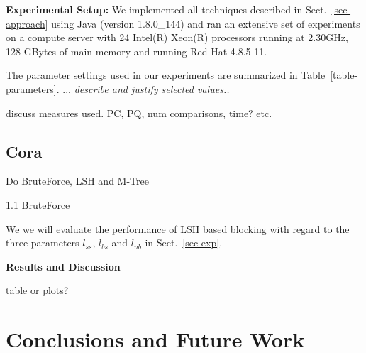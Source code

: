 \documentclass{llncs}
\begin{document}
\smallskip
\textbf{Experimental Setup:}
%
We implemented all techniques described in Sect.~\ref{sec-approach}
using Java (version 1.8.0\_144) and ran an extensive set of experiments on
a compute server with 24 Intel(R) Xeon(R) processors running at 2.30GHz, 
128 GBytes of main memory and running Red Hat 4.8.5-11.

The parameter settings used in our experiments are summarized in
Table~\ref{table-parameters}. ... \emph{describe and justify selected
values..}

discuss measures used. PC, PQ, num comparisons, time? etc.

\subsection{Cora}

Do BruteForce, LSH and M-Tree

1.1 BruteForce

We we will evaluate the performance of LSH based blocking with regard to the three parameters $l_{ss}$, $l_{bs}$ and $l_{nb}$ in
Sect.~\ref{sec-exp}.


\smallskip
\textbf{Results and Discussion}


table or plots?


\section{Conclusions and Future Work}
\label{sec-concl}



%
 

\end{document}
